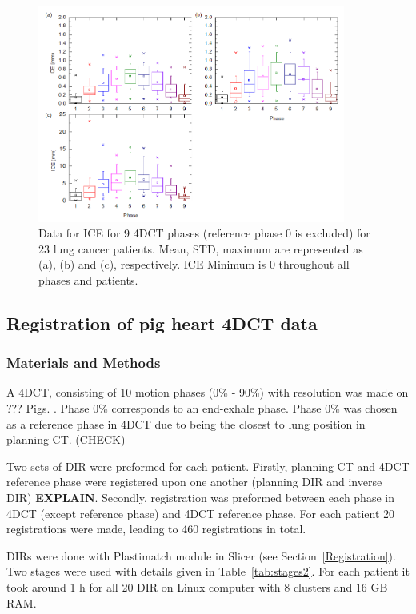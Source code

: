 \documentclass[type=dr, dr=rernat, accentcolor=tud7b,colorbacktitle, bigchapter, openright, twoside, 12pt ]{tudthesis}
\begin{document}
\begin{figure}[H]
	\begin{center}		
		\includegraphics[width=0.9\textwidth]{./Images/ICE.png}
		\caption{Data for ICE for 9 4DCT phases (reference phase 0 is excluded) for 23 lung cancer patients. Mean, STD, maximum are represented as (a), (b) and (c), respectively. ICE Minimum is 0 throughout all phases and patients.}
		\label{ice}
	\end{center}
\end{figure}

\subsection{Registration of pig heart 4DCT data}

\subsubsection{Materials and Methods}

A 4DCT, consisting of 10 motion phases (0\% - 90\%) with resolution was made on ??? Pigs. .
Phase 0\% corresponds to an end-exhale phase. Phase 0\% was chosen as a reference phase in 4DCT due to being the closest to lung position in planning CT. (CHECK)

Two sets of DIR were preformed for each patient. Firstly, planning CT and 4DCT reference phase were registered upon one another (planning DIR and inverse DIR) \textbf{EXPLAIN}. Secondly, registration was preformed between each phase in 4DCT
(except reference phase) and 4DCT reference phase. For each patient 20 registrations were made, leading to 460 registrations in total.

DIRs were done with Plastimatch module in Slicer (see Section~\ref{Registration}). Two stages were used with details given in Table~\ref{tab:stages2}. For each patient it took around 1 h for all 20 DIR on Linux computer with 8 clusters and 16 GB RAM.
\end{document}
